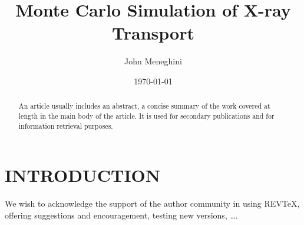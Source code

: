\documentclass[%
 aip,
cp,  %
 amsmath,amssymb,%
reprint,%
]{revtex4-2}
\begin{document}
\title{Monte Carlo Simulation of X-ray Transport}%

\author{John Meneghini} %

\date{\today} %

\begin{abstract}
An article usually includes an abstract, a concise summary of the work
covered at length in the main body of the article. It is used for
secondary publications and for information retrieval purposes.
\end{abstract}

\maketitle

\section{INTRODUCTION}


















\begin{acknowledgments}
We wish to acknowledge the support of the author community in using
REV\TeX{}, offering suggestions and encouragement, testing new versions,
\dots.
\end{acknowledgments}


\end{document}
